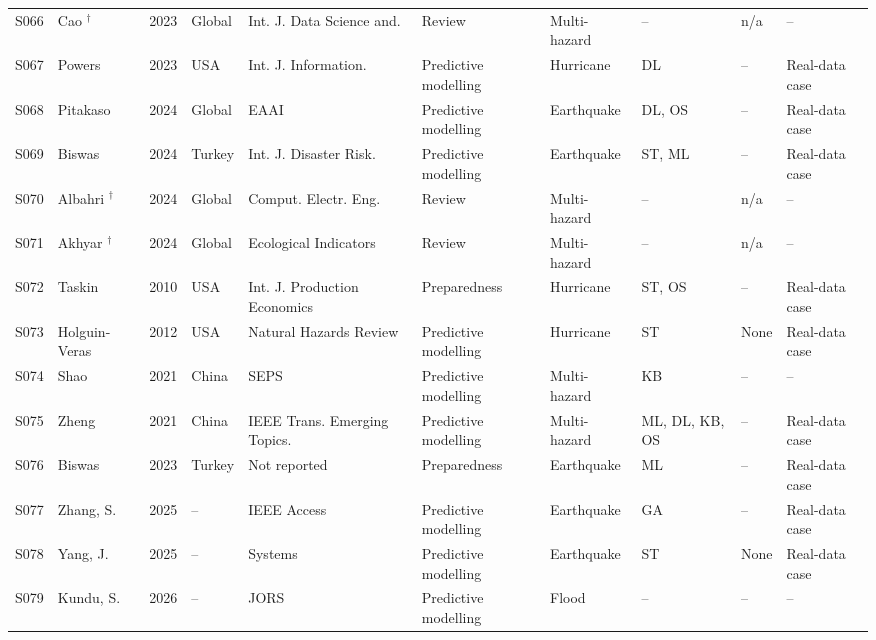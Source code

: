 \begin{landscape}
\begin{longtable}{@{}p{1.0cm}p{3.3cm}p{0.8cm}p{2.3cm}p{3.1cm}p{2.6cm}p{2.2cm}p{1.9cm}p{2.3cm}p{2.2cm}@{}}
S066 & Cao \cite{Cao2023AIResilience}$^{\dagger}$ & 2023 & Global & Int. J. Data Science and. & Review & Multi-hazard & -- & n/a & -- \\
S067 & Powers \cite{Powers2023UsingApproach} & 2023 & USA & Int. J. Information. & Predictive modelling & Hurricane & DL & -- & Real-data case \\
S068 & Pitakaso \cite{Pitakaso2024Optimization-drivenManagement} & 2024 & Global & EAAI & Predictive modelling & Earthquake & DL, OS & -- & Real-data case \\
S069 & Biswas \cite{Biswas2024AnTurkiye} & 2024 & Turkey & Int. J. Disaster Risk. & Predictive modelling & Earthquake & ST, ML & -- & Real-data case \\
S070 & Albahri \cite{Albahri2024ADisasters}$^{\dagger}$ & 2024 & Global & Comput. Electr. Eng. & Review & Multi-hazard & -- & n/a & -- \\
S071 & Akhyar \cite{Akhyar2024DeepReview}$^{\dagger}$ & 2024 & Global & Ecological Indicators & Review & Multi-hazard & -- & n/a & -- \\
S072 & Taskin \cite{Taskin2010InventoryPredictions} & 2010 & USA & Int. J. Production Economics & Preparedness & Hurricane & ST, OS & -- & Real-data case \\
S073 & Holguin-Veras \cite{Holguin-Veras2012ImmediateKatrina} & 2012 & USA & Natural Hazards Review & Predictive modelling & Hurricane & ST & None & Real-data case \\
S074 & Shao \cite{Shao2021ReliefReasoning} & 2021 & China & SEPS & Predictive modelling & Multi-hazard & KB & -- & -- \\
S075 & Zheng \cite{Zheng2022Co-EvolutionaryForecasting} & 2021 & China & IEEE Trans. Emerging Topics. & Predictive modelling & Multi-hazard & ML, DL, KB, OS & -- & Real-data case \\
S076 & Biswas \cite{Biswas2023PredictionTurkey} & 2023 & Turkey & Not reported & Preparedness & Earthquake & ML & -- & Real-data case \\
S077 & Zhang, S. \cite{Zhang2025RAGEarthquakeMaterial} & 2025 & -- & IEEE Access & Predictive modelling & Earthquake & GA & -- & Real-data case \\
S078 & Yang, J. \cite{Yang2025CasualtyEmergencyMaterial} & 2025 & -- & Systems & Predictive modelling & Earthquake & ST & None & Real-data case \\
S079 & Kundu, S. \cite{Kundu2026ReliefFloodPrediction} & 2026 & -- & JORS & Predictive modelling & Flood & -- & -- & -- \\

\end{longtable}
\end{landscape}
